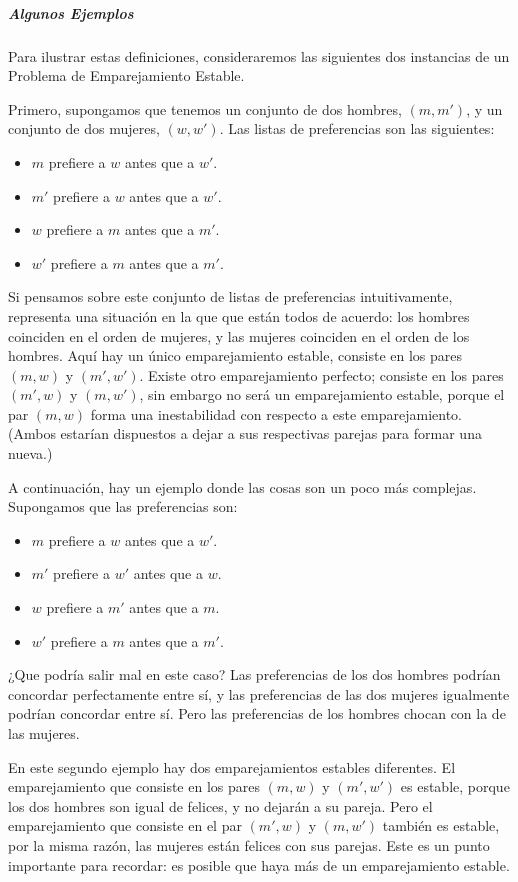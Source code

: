 \documentclass[a4paper, 12pt]{book}
\begin{document}
\subparagraph{Algunos Ejemplos} Para ilustrar estas definiciones, consideraremos las siguientes dos instancias de un Problema de Emparejamiento Estable.

Primero, supongamos que tenemos un conjunto de dos hombres, $(m,m')$, y un conjunto de dos mujeres, $(w, w')$.  Las listas de preferencias son las siguientes:

   \begin{itemize}
      \item $m$ prefiere a $w$ antes que a $w'$.
      \item $m'$ prefiere a $w$ antes que a $w'$.
      \item $w$ prefiere a $m$ antes que a $m'$.
      \item $w'$ prefiere a $m$ antes que a $m'$.
    \end{itemize}
    
Si pensamos sobre este conjunto de listas de preferencias intuitivamente, representa una situación en la que que están todos de acuerdo: los hombres coinciden en el orden de mujeres, y las mujeres coinciden en el orden de los hombres. Aquí hay un único emparejamiento estable, consiste en los pares $(m,w)$ y $(m',w')$. Existe otro emparejamiento perfecto; consiste en los pares $(m',w)$ y $(m,w')$, sin embargo no será un emparejamiento estable, porque el par $(m,w)$ forma una inestabilidad con respecto a este  emparejamiento. (Ambos estarían dispuestos a dejar a sus respectivas parejas para formar una nueva.)

A continuación, hay un ejemplo donde las cosas son un poco más complejas. Supongamos que las preferencias son:

   \begin{itemize}
      \item $m$ prefiere a $w$ antes que a $w'$.
      \item $m'$ prefiere a $w'$ antes que a $w$.
      \item $w$ prefiere a $m'$ antes que a $m$.
      \item $w'$ prefiere a $m$ antes que a $m'$.
    \end{itemize}
    
¿Que podría salir mal en este caso? Las preferencias de los dos hombres podrían concordar perfectamente entre sí, y las preferencias de las dos mujeres igualmente podrían concordar entre sí. Pero las preferencias de los hombres chocan con la de las mujeres. 

En este segundo ejemplo hay dos emparejamientos estables diferentes. El emparejamiento que consiste en los pares $(m, w)$ y $(m',w')$ es estable, porque los dos hombres son igual de felices, y no dejarán a su pareja. Pero el emparejamiento que consiste en el par $(m',w)$ y $(m,w')$ también es estable, por la misma razón, las mujeres están felices con sus parejas. Este es un punto importante para recordar: es posible que haya más de un emparejamiento estable.
\end{document}
